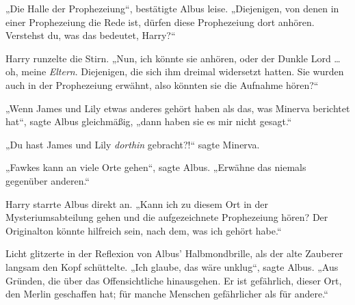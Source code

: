 „Die Halle der Prophezeiung“, bestätigte Albus leise.
„Diejenigen, von denen in einer Prophezeiung die Rede ist, dürfen diese Prophezeiung dort anhören. Verstehst du, was das bedeutet, Harry?“

Harry runzelte die Stirn.
„Nun, ich könnte sie anhören, oder der Dunkle Lord … oh, meine \emph{Eltern}. Diejenigen, die sich ihm dreimal widersetzt hatten. Sie wurden auch in der Prophezeiung erwähnt, also könnten sie die Aufnahme hören?“

„Wenn James und Lily etwas anderes gehört haben als das, was Minerva berichtet hat“, sagte Albus gleichmäßig, „dann haben sie es mir nicht gesagt.“

„Du hast James und Lily \emph{dorthin} gebracht?!“ sagte Minerva.

„Fawkes kann an viele Orte gehen“, sagte Albus.
„Erwähne das niemals gegenüber anderen.“

Harry starrte Albus direkt an.
„Kann ich zu diesem Ort in der Mysteriumsabteilung gehen und die aufgezeichnete Prophezeiung hören? Der Originalton könnte hilfreich sein, nach dem, was ich gehört habe.“

Licht glitzerte in der Reflexion von Albus’ Halbmondbrille, als der alte Zauberer langsam den Kopf schüttelte.
„Ich glaube, das wäre unklug“, sagte Albus.
„Aus Gründen, die über das Offensichtliche hinausgehen. Er ist gefährlich, dieser Ort, den Merlin geschaffen hat; für manche Menschen gefährlicher als für andere.“

